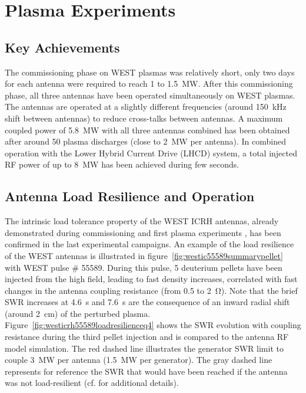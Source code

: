 \documentclass[12p]{iopart}
\begin{document}
\section{Plasma Experiments}
\subsection{Key Achievements}
The commissioning phase on WEST plasmas was relatively short, only two days for each antenna were required to reach 1 to \SI{1.5}{\mega\watt}. After this commissioning phase, all three antennas have been operated simultaneously on WEST plasmas. The antennas are operated at a slightly different frequencies (around \SI{150}{\kilo\hertz} shift between antennas) to reduce cross-talks between antennas. A maximum coupled power of \SI{5.8}{\mega\watt} with all three antennas combined has been obtained after around 50 plasma discharges (close to \SI{2}{\mega\watt} per antenna). In combined operation with the Lower Hybrid Current Drive (LHCD) system, a total injected RF power of up to \SI{8}{\mega\watt} has been achieved during few seconds\cite{bucalossi2021}. 



\subsection{Antenna Load Resilience and Operation}
The intrinsic load tolerance property of the WEST ICRH antennas, already demonstrated during commissioning and first plasma experiments \cite{helou2020}, has been confirmed in the last experimental campaigns. An example of the load resilience of the WEST antennas is illustrated in figure~\ref{fig:westic55589summarypellet} with WEST pulse \# 55589. During this pulse, 5 deuterium pellets have been injected from the high field, leading to fast density increases, correlated with fast changes in the antenna coupling resistance (from 0.5 to \SI{2}{\ohm}). Note that the brief SWR increases at \SI{4.6}{\second} and \SI{7.6}{\second} are the consequence of an inward radial shift (around \SI{2}{\centi\meter}) of the perturbed plasma. Figure~\ref{fig:westicrh55589loadresilienceq4} shows the SWR evolution with coupling resistance during the third pellet injection and is compared to the antenna RF model simulation. The red dashed line illustrates the generator SWR limit to couple \SI{3}{\mega\watt} per antenna (\SI{1.5}{\mega\watt} per generator). The gray dashed line represents for reference the SWR that would have been reached if the antenna was not load-resilient (cf.\cite{helou2020} for additional details). 
\end{document}
